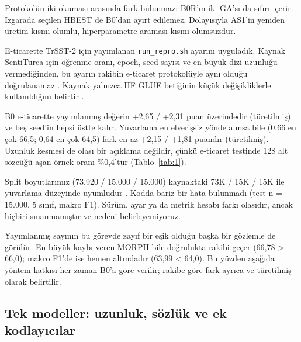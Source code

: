 \documentclass[11pt]{article}
\begin{document}
Protokolün iki okuması arasında fark bulunmaz: B0R'ın iki GA'sı da sıfırı içerir. Izgarada seçilen HBEST de B0'dan ayırt edilemez. Dolayısıyla AS1'in yeniden üretim kısmı olumlu, hiperparametre araması kısmı olumsuzdur.

E-ticarette TrSST-2 için yayımlanan \texttt{run\_\allowbreak{}\allowbreak{}repro.\allowbreak{}\allowbreak{}sh} ayarını uyguladık. Kaynak SentiTurca için öğrenme oranı, epoch, seed sayısı ve en büyük dizi uzunluğu vermediğinden, bu ayarın rakibin e-ticaret protokolüyle aynı olduğu doğrulanamaz \citep{altinok2025}. Kaynak yalnızca HF GLUE betiğinin küçük değişikliklerle kullanıldığını belirtir \citep{altinok2025}.

B0 e-ticarette yayımlanmış değerin +2,65 / +2,31 puan üzerindedir (türetilmiş) ve beş seed'in hepsi üstte kalır. Yuvarlama en elverişsiz yönde alınsa bile (0,66 en çok 66,5; 0,64 en çok 64,5) fark en az +2,15 / +1,81 puandır (türetilmiş). Uzunluk kesmesi de olası bir açıklama değildir, çünkü e-ticaret testinde 128 alt sözcüğü aşan örnek oranı \%0,4'tür (Tablo~\ref{tab:1}).

Split boyutlarımız (73.920 / 15.000 / 15.000) kaynaktaki 73K / 15K / 15K ile yuvarlama düzeyinde uyumludur \citep{altinok2025}. Kodda bariz bir hata bulunmadı (test n = 15.000, 5 sınıf, makro F1). Sürüm, ayar ya da metrik hesabı farkı olasıdır, ancak hiçbiri sınanmamıştır ve nedeni belirleyemiyoruz.

Yayımlanmış sayının bu görevde zayıf bir eşik olduğu başka bir gözlemle de görülür. En büyük kaybı veren MORPH bile doğrulukta rakibi geçer (66,78 > 66,0); makro F1'de ise hemen altındadır (63,99 < 64,0). Bu yüzden aşağıda yöntem katkısı her zaman B0'a göre verilir; rakibe göre fark ayrıca ve türetilmiş olarak belirtilir.

\subsection{Tek modeller: uzunluk, sözlük ve ek kodlayıcılar}
\end{document}
